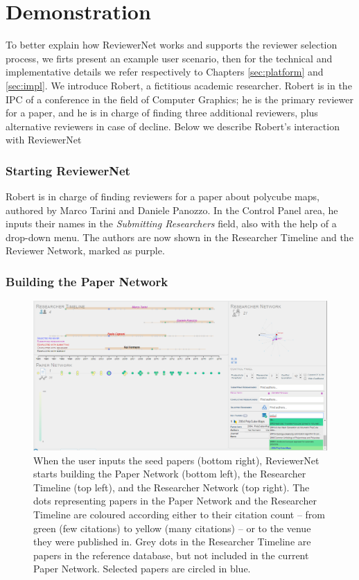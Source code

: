 \chapter{Demonstration}\label{sec:demonstration}
To better explain how ReviewerNet works and supports the reviewer selection process, we firts present an example user scenario, then for the technical and implementative details we refer respectively to Chapters \ref{sec:platform} and \ref{sec:impl}.
We introduce Robert, a fictitious academic researcher. Robert is in the IPC of a conference in the field of Computer Graphics; he is the primary reviewer for a paper, and he is in charge of finding three additional reviewers, plus alternative reviewers in case of decline. 
Below we describe Robert's interaction with ReviewerNet
\subsection*{Starting ReviewerNet}

Robert is in charge of finding reviewers for a paper about polycube maps, authored by Marco Tarini and Daniele Panozzo. In the Control Panel area, he inputs their names in the \emph{Submitting Researchers} field, also with the help of a drop-down menu. The authors are now shown in the Researcher Timeline and the Reviewer Network, marked as purple. 
\subsection*{Building the Paper Network} 

\begin{figure}[!ht]
    \centering
    \includegraphics[width=\textwidth]{fig/insertion_manual.png}		
    \caption{When the user inputs the seed papers (bottom right), ReviewerNet starts building the Paper Network (bottom left), the Researcher Timeline (top left), and the Researcher Network (top right). The dots representing papers in the Paper Network and the Researcher Timeline are coloured according {either to their citation count -- from green (few citations) to yellow (many citations) -- or to the venue they were published in}. Grey dots in the Researcher Timeline are papers in the reference database, but not included in the current Paper Network. Selected papers are circled in blue.}%
    \label{fig:keypapers}
\end{figure}

